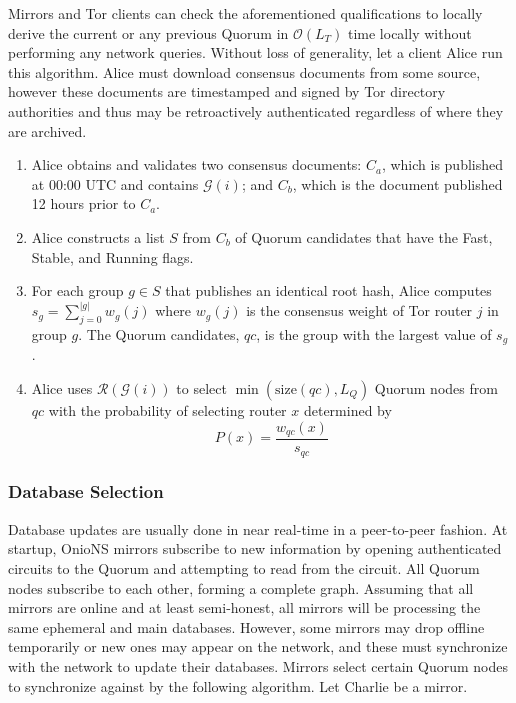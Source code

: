 \documentclass[USenglish,oneside,twocolumn]{article}
\begin{document}
Mirrors and Tor clients can check the aforementioned qualifications to locally derive the current or any previous Quorum in $ \mathcal{O}(L_{T}) $ time locally without performing any network queries. Without loss of generality, let a client Alice run this algorithm. Alice must download consensus documents from some source, however these documents are timestamped and signed by Tor directory authorities and thus may be retroactively authenticated regardless of where they are archived.

\begin{enumerate}
	\item Alice obtains and validates two consensus documents: $ C_{a} $, which is published at 00:00 UTC and contains $ \mathcal{G}(i) $; and $ C_{b} $, which is the document published 12 hours prior to $ C_{a} $. 
	\item Alice constructs a list $ S $ from $ C_{b} $ of Quorum candidates that have the Fast, Stable, and Running flags.
	\item For each group $ g \in S $ that publishes an identical root hash, Alice computes $ s_{g} = \sum_{j=0}^{\left\vert{g}\right\vert} w_{g}(j) $ where $ w_{g}(j) $ is the consensus weight of Tor router $ j $ in group $ g $. The Quorum candidates, $ \mathit{qc} $, is the group with the largest value of $ s_{g} $.
	\item Alice uses $ \mathcal{R}(\mathcal{G}(i)) $ to select $ \min(\mathrm{size}(\mathit{qc}), L_{Q}) $ Quorum nodes from $ \mathit{qc} $ with the probability of selecting router $ x $ determined by 
	\[
			P(x) = \frac{w_{\mathit{qc}}(x)}{s_{\mathit{qc}}}
	\]
\end{enumerate}

\subsubsection{Database Selection}

Database updates are usually done in near real-time in a peer-to-peer fashion. At startup, OnioNS mirrors subscribe to new information by opening authenticated circuits to the Quorum and attempting to read from the circuit. All Quorum nodes subscribe to each other, forming a complete graph. Assuming that all mirrors are online and at least semi-honest, all mirrors will be processing the same ephemeral and main databases. However, some mirrors may drop offline temporarily or new ones may appear on the network, and these must synchronize with the network to update their databases. Mirrors select certain Quorum nodes to synchronize against by the following algorithm. Let Charlie be a mirror.
\end{document}
